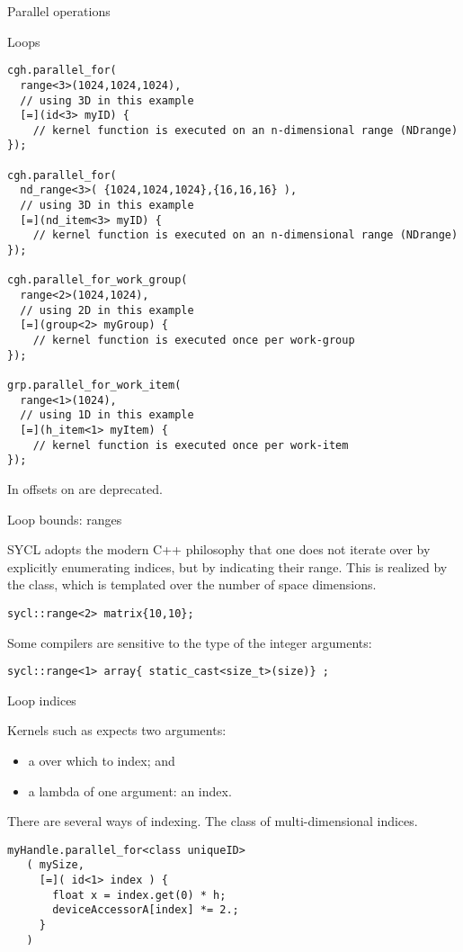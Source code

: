  {Parallel operations}

 {Loops}
  
\begin{lstlisting}
cgh.parallel_for(
  range<3>(1024,1024,1024),
  // using 3D in this example
  [=](id<3> myID) {
    // kernel function is executed on an n-dimensional range (NDrange)
});

cgh.parallel_for(
  nd_range<3>( {1024,1024,1024},{16,16,16} ),
  // using 3D in this example 
  [=](nd_item<3> myID) {
    // kernel function is executed on an n-dimensional range (NDrange)
});

cgh.parallel_for_work_group(
  range<2>(1024,1024),
  // using 2D in this example
  [=](group<2> myGroup) {
    // kernel function is executed once per work-group
});

grp.parallel_for_work_item(
  range<1>(1024),
  // using 1D in this example
  [=](h_item<1> myItem) {
    // kernel function is executed once per work-item
});
\end{lstlisting}

In  offsets on  
are deprecated.

 {Loop bounds: ranges}

SYCL adopts the modern C++ philosophy that one does not iterate
over by explicitly enumerating indices, but by indicating their range.
This is realized by the  class,
which is templated over the number of space dimensions.

\begin{lstlisting}
sycl::range<2> matrix{10,10};
\end{lstlisting}

Some compilers are sensitive to the type of the integer arguments:
\begin{lstlisting}
sycl::range<1> array{ static_cast<size_t>(size)} ;
\end{lstlisting}

 {Loop indices}

Kernels such as 
expects two arguments:
\begin{itemize}
\item a  over which to index; and
\item a lambda of one argument: an index.
\end{itemize}

There are several ways of indexing.
The  class of multi-dimensional indices.
\begin{lstlisting}
myHandle.parallel_for<class uniqueID>
   ( mySize,
     [=]( id<1> index ) {
       float x = index.get(0) * h;
       deviceAccessorA[index] *= 2.;
     }
   )
\end{lstlisting}

